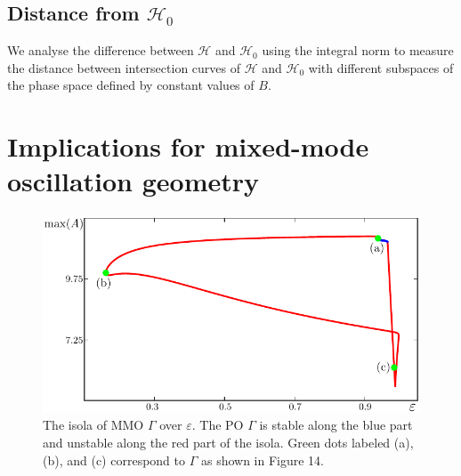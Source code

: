 \documentclass{ws-ijbc}
\begin{document}
\subsection{Distance from $\mathscr{H}_0$}

We analyse the difference between $\mathscr{H}$ and $\mathscr{H}_0$ using the integral norm to measure the distance between intersection curves of $\mathscr{H}$ and $\mathscr{H}_0$ with different subspaces of the phase space defined by constant values of $B$.


\section{Implications for mixed-mode oscillation geometry}


\begin{figure}[H]
\centering
\includegraphics[]{./figures/MKMO_12.pdf}
\caption{The isola of MMO $\Gamma$ over $\varepsilon$.  The PO $\Gamma$ is stable along the blue part and unstable along the red part of the isola.  Green dots labeled (a), (b), and (c) correspond to $\Gamma$ as shown in Figure 14.}
\label{figure_12}
\end{figure}
\end{document}
